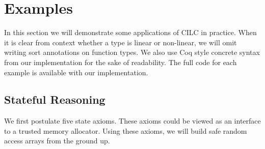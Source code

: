 \documentclass[sigplan,screen,review,anonymous]{acmart}
\begin{document}
\section{Examples}\label{examples}
In this section we will demonstrate some applications of CILC in practice. When it is clear from context whether a type is linear or non-linear, we will omit writing sort annotations on function types. We also use Coq style concrete syntax from our implementation for the sake of readability. The full code for each example is available with our implementation.

\subsection{Stateful Reasoning}
We first postulate five state axioms. These axioms could be viewed as an interface to a trusted memory allocator. Using these axioms, we will build safe random access arrays from the ground up.
\end{document}
